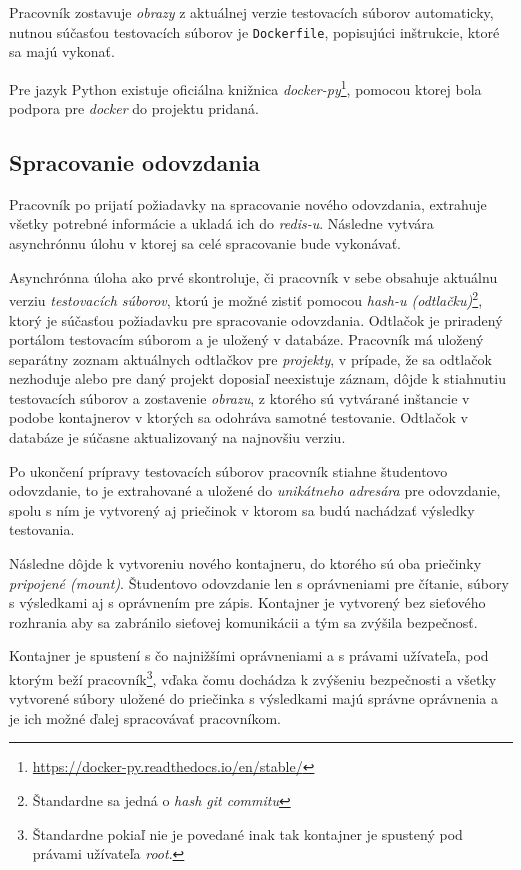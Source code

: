 \documentclass[
  digital, %
  twoside, %
  table,   %
  lof,     %
  lot,     %
]{fithesis3}
\begin{document}
Pracovník zostavuje \emph{obrazy} z aktuálnej verzie testovacích súborov automaticky, nutnou súčasťou testovacích súborov je \texttt{Dockerfile}, popisujúci inštrukcie, ktoré sa majú vykonať.

Pre jazyk Python existuje oficiálna knižnica \emph{docker-py}\footnote{\url{https://docker-py.readthedocs.io/en/stable/}}, pomocou ktorej bola podpora pre \emph{docker} do projektu pridaná.


\subsection{Spracovanie odovzdania}

Pracovník po prijatí požiadavky na spracovanie nového odovzdania, extrahuje všetky potrebné informácie a ukladá ich do \emph{redis-u}. Následne vytvára asynchrónnu úlohu v ktorej sa celé spracovanie bude vykonávať.

Asynchrónna úloha ako prvé skontroluje, či pracovník v sebe obsahuje aktuálnu verziu \emph{testovacích súborov}, ktorú je možné zistiť pomocou \emph{hash-u (odtlačku)}\footnote{Štandardne sa jedná o \emph{hash git commitu}}, ktorý je súčasťou požiadavku pre spracovanie odovzdania. Odtlačok je priradený portálom testovacím súborom a je uložený v databáze. Pracovník má uložený separátny zoznam aktuálnych odtlačkov pre \emph{projekty}, v prípade, že sa odtlačok nezhoduje alebo pre daný projekt doposiaľ neexistuje záznam, dôjde k stiahnutiu testovacích súborov a zostavenie \emph{obrazu}, z ktorého sú vytvárané inštancie v podobe kontajnerov v ktorých sa odohráva samotné testovanie. Odtlačok v databáze je súčasne aktualizovaný na najnovšiu verziu.

Po ukončení prípravy testovacích súborov pracovník stiahne študentovo odovzdanie, to je extrahované a uložené do \emph{unikátneho adresára} pre odovzdanie, spolu s ním je vytvorený aj priečinok v ktorom sa budú nachádzať výsledky testovania. 

Následne dôjde k vytvoreniu nového kontajneru, do ktorého sú oba priečinky \emph{pripojené \emph{(mount)}}. Študentovo odovzdanie len s oprávneniami pre čítanie, súbory s výsledkami aj s oprávnením pre zápis. Kontajner je vytvorený bez sieťového rozhrania aby sa zabránilo sieťovej komunikácii a tým sa zvýšila bezpečnosť.

Kontajner je spustení s čo najnižšími oprávneniami a s  právami užívateľa, pod ktorým beží pracovník\footnote{Štandardne pokiaľ nie je povedané inak tak kontajner je spustený pod právami užívateľa \emph{root}.}, vďaka čomu dochádza k zvýšeniu bezpečnosti a všetky vytvorené súbory uložené do priečinka s výsledkami majú správne oprávnenia a je ich možné ďalej spracovávať pracovníkom.
\end{document}

